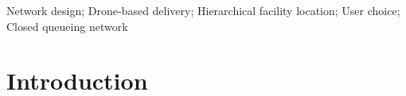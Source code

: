 \documentclass[final,3p,authoryear]{elsarticle}
\begin{document}
\begin{frontmatter}
\begin{abstract}
\color{black}
\end{abstract}

\begin{keyword}
Network design; Drone-based delivery; Hierarchical facility location; User choice; Closed queueing network
\end{keyword}

\end{frontmatter}

\section{Introduction}
\label{sec:introduction}

\end{document}
